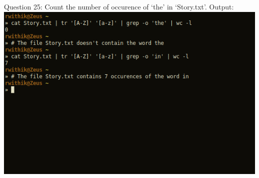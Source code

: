 \documentclass[10pt,a4paper,titlepage]{report}
\begin{document}
\newline
Question 25: Count the number of occurence of ‘the’ in ‘Story.txt’.\newline
Output:\newline
\includegraphics[scale=.5]{../Images/Cycle2/25.png}\newline
\newline
\end{document}
